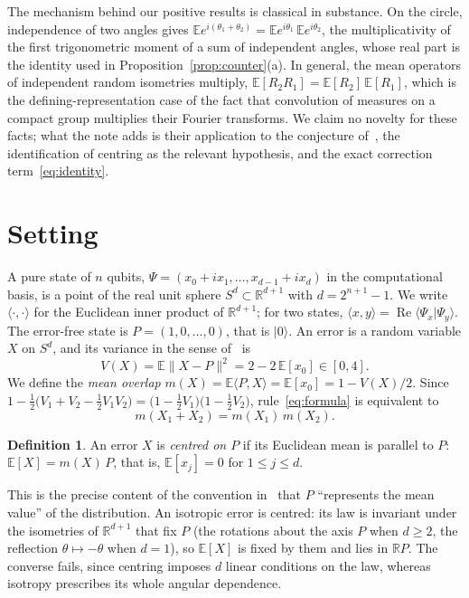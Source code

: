 \documentclass[11pt,a4paper]{article}
\theoremstyle{definition}
\newtheorem{definition}[theorem]{Definition}
\theoremstyle{plain}
\newcommand{\ket}[1]{\lvert#1\rangle}
\newcommand{\norm}[1]{\lVert#1\rVert}
\newcommand{\R}{\mathbb{R}}
\newcommand{\E}{\mathbb{E}}
\newcommand{\ip}[2]{\langle#1,#2\rangle}
\begin{document}
The mechanism behind our positive results is classical in substance. On the
circle, independence of two angles gives
$\E e^{i(\theta_1+\theta_2)}=\E e^{i\theta_1}\,\E e^{i\theta_2}$, the
multiplicativity of the first trigonometric moment of a sum of independent
angles, whose real part is the identity used in
Proposition~\ref{prop:counter}(a). In general, the mean operators of
independent random isometries multiply,
$\E[R_2R_1]=\E[R_2]\,\E[R_1]$, which is the defining-representation case of
the fact that convolution of measures on a compact group multiplies their
Fourier transforms. We claim no novelty for these facts; what the note adds
is their application to the conjecture of~\cite{LacallePozo2019}, the
identification of centring as the relevant hypothesis, and the exact
correction term~\eqref{eq:identity}.

\section{Setting}\label{sec:setting}
A pure state of $n$ qubits, $\Psi=(x_0+ix_1,\dots,x_{d-1}+ix_d)$ in the
computational basis, is a point of the real unit sphere
$S^d\subset\R^{d+1}$ with $d=2^{n+1}-1$. We write $\ip\cdot\cdot$ for the
Euclidean inner product of $\R^{d+1}$; for two states,
$\ip xy=\operatorname{Re}\langle\Psi_x|\Psi_y\rangle$. The error-free state is
$P=(1,0,\dots,0)$, that is $\ket0$. An error is a random variable $X$ on
$S^d$, and its variance in the sense of~\cite{LacallePozo2019} is
\[
V(X)=\E\norm{X-P}^2=2-2\,\E[x_0]\in[0,4].
\]
We define the \emph{mean overlap} $m(X)=\E\ip PX=\E[x_0]=1-V(X)/2$. Since
$1-\tfrac12\bigl(V_1+V_2-\tfrac12V_1V_2\bigr)=\bigl(1-\tfrac12V_1\bigr)
\bigl(1-\tfrac12V_2\bigr)$, rule~\eqref{eq:formula} is equivalent to
\begin{equation}\label{eq:mult}
m(X_1+X_2)=m(X_1)\,m(X_2).
\end{equation}

\begin{definition}
An error $X$ is \emph{centred on $P$} if its Euclidean mean is parallel to
$P$: $\E[X]=m(X)\,P$, that is, $\E[x_j]=0$ for $1\le j\le d$.
\end{definition}

This is the precise content of the convention in~\cite{LacallePozo2019} that
$P$ ``represents the mean value'' of the distribution. An isotropic error is
centred: its law is invariant under the isometries of $\R^{d+1}$ that fix $P$
(the rotations about the axis $P$ when $d\ge2$, the reflection
$\theta\mapsto-\theta$ when $d=1$), so $\E[X]$ is fixed by them and lies in
$\R P$. The converse fails, since centring imposes $d$ linear conditions on
the law, whereas isotropy prescribes its whole angular dependence.
\end{document}
